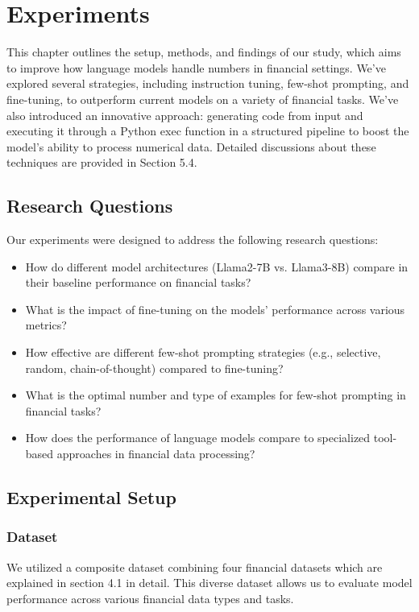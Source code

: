 \documentclass[logo,msc]{infthesis}           %
\begin{document}
\chapter{Experiments}

This chapter outlines the setup, methods, and findings of our study, which aims to improve how language models handle numbers in financial settings. We've explored several strategies, including instruction tuning, few-shot prompting, and fine-tuning, to outperform current models on a variety of financial tasks. We've also introduced an innovative approach: generating code from input and executing it through a Python exec function in a structured pipeline to boost the model’s ability to process numerical data. Detailed discussions about these techniques are provided in Section 5.4.

\section{Research Questions}
Our experiments were designed to address the following research questions:
\begin{itemize}
\item How do different model architectures (Llama2-7B vs. Llama3-8B) compare in their baseline performance on financial tasks?
\item What is the impact of fine-tuning on the models' performance across various metrics?
\item How effective are different few-shot prompting strategies (e.g., selective, random, chain-of-thought) compared to fine-tuning?
\item What is the optimal number and type of examples for few-shot prompting in financial tasks?
\item How does the performance of language models compare to specialized tool-based approaches in financial data processing?
\end{itemize}

\section{Experimental Setup}

\subsection{Dataset}
We utilized a composite dataset combining four financial datasets which are explained in section 4.1 in detail. This diverse dataset allows us to evaluate model performance across various financial data types and tasks.
\end{document}
